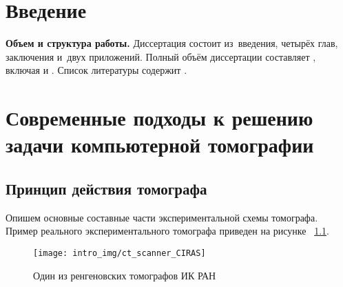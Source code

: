 \chapter*{Введение}							%

\newcommand{\actuality}{{\textbf\actualityTXT}}
\newcommand{\progress}{}
\newcommand{\actualityandprogress}{\textbf{\actualityandprogressTXT}}
\newcommand{\aim}{{\textbf\aimTXT}}
\newcommand{\tasks}{\textbf{\tasksTXT}}
\newcommand{\novelty}{\textbf{\noveltyTXT}}
\newcommand{\influence}{\textbf{\influenceTXT}}
\newcommand{\methods}{\textbf{\methodsTXT}}
\newcommand{\defpositions}{\textbf{\defpositionsTXT}}
\newcommand{\reliability}{\textbf{\reliabilityTXT}}
\newcommand{\probation}{\textbf{\probationTXT}}
\newcommand{\contribution}{\textbf{\contributionTXT}}
\newcommand{\publications}{\textbf{\publicationsTXT}}


\textbf{Объем и структура работы.} Диссертация состоит из~введения, четырёх глав, заключения и~двух приложений.
%
Полный объём диссертации составляет
, включая
 и
.   Список литературы содержит  
.


\chapter{Современные подходы к решению задачи компьютерной томографии}
\section{Принцип действия томографа}
Опишем основные составные части экспериментальной схемы томографа.
Пример реального экспериментального томографа приведен на рисунке ~\ref{fig:ct_scanner}.

\begin{figure}
\centering
\label{fig:ct_scanner}
\texttt{[image: intro\_img/ct\_scanner\_CIRAS]}
\caption{Один из ренгеновских томографов ИК РАН}
\end{figure}

